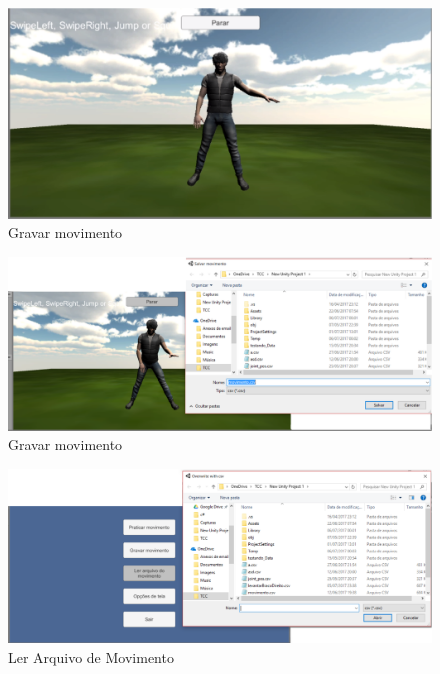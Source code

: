      \begin{figure}[H]
     \centering
     \includegraphics [keepaspectratio=true,scale=0.40]{figuras/gravarmovimento.eps}
     \caption{Gravar movimento}
     \label{img:gravarmovimento}
     \end{figure}

     \begin{figure}[H]
     \centering
     \includegraphics [keepaspectratio=true,scale=0.40]{figuras/gravarmovimento2.eps}
     \caption{Gravar movimento}
     \label{img2:gravarmovimento}
     \end{figure}

     \begin{figure}[H]
     \centering
     \includegraphics [keepaspectratio=true,scale=0.40]{figuras/lerarquivo.eps}
     \caption{Ler Arquivo de Movimento}
     \label{img:lerArquivo}
     \end{figure}


